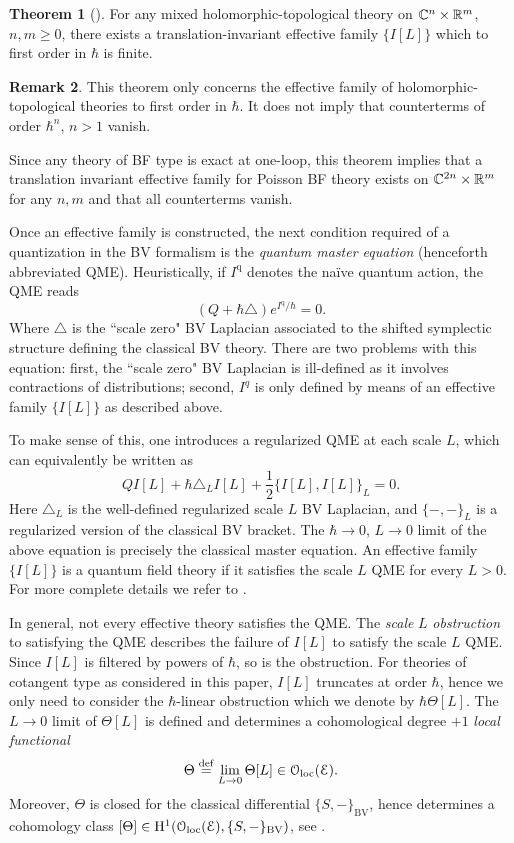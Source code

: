 \documentclass[11pt, oneside, reqno]{amsart}
\theoremstyle{definition} \newtheorem{definition}{Definition}[section]
\newtheorem{theorem}[definition]{Theorem}
\theoremstyle{definition}
\theoremstyle{remark}
\theoremstyle{definition} \newtheorem{remark}[definition]{Remark}
\theoremstyle{definition} \newtheorem{remarks}[definition]{Remarks}
\theoremstyle{definition} \newtheorem{question}[definition]{Question}
\theoremstyle{definition} \newtheorem*{note}{Note}
\theoremstyle{definition} \newtheorem{example}[definition]{Example}
\theoremstyle{definition} \newtheorem{examples}[definition]{Examples}
\def\oloc{\mathcal{O}_{\rm loc}}
\def\cE{\mathcal E}\def\cF{\mathcal F}\def\cG{\mathcal G}\def\cH{\mathcal H}
\newcommand{\mr}[1]{\mathrm{#1}}
\def\define{\overset{\rm def}{=}}
\begin{document}
\begin{theorem}[\cite{BWhol, GWcs, GWR}] \label{thm:oneloop}
For any mixed holomorphic-topological theory on $\mathbb C^n \times \mathbb R^m$, $n,m \geq 0$, there exists 
a translation-invariant effective family $\{I[L]\}$ which to first order in $\hbar$ is finite. 
\end{theorem}

\begin{remark}
This theorem only concerns the effective family of holomorphic-topological theories to first order in $\hbar$. 
It does not imply that counterterms of order $\hbar^n$, $n > 1$ vanish. 
\end{remark} 

Since any theory of BF type is exact at one-loop, this theorem implies that a translation invariant effective family for Poisson BF theory exists on $\mathbb C^{2n} \times \mathbb R^m$ for any $n,m$ and that all counterterms vanish.

Once an effective family is constructed, the next condition required of a quantization in the BV formalism is the {\em quantum master equation} (henceforth abbreviated QME). Heuristically, if $I^{\mr{q}}$ denotes the na\"ive quantum action, the QME reads
\[(Q + \hbar \triangle) e^{I^{\mr{q}}/\hbar} = 0.\]
Where $\triangle$ is the ``scale zero" BV Laplacian associated to the shifted symplectic structure defining the classical BV theory. 
There are two problems with this equation: first, the ``scale zero" BV Laplacian is ill-defined as it involves contractions of distributions; second, $I^q$ is only defined by means of an effective family $\{I[L]\}$ as described above. 

To make sense of this, one introduces a regularized QME at each scale $L$, which can equivalently be written as
\[
Q I[L] + \hbar \triangle_L I[L] + \frac{1}{2} \{I[L], I[L]\}_L = 0 .
\]
Here $\triangle_L$ is the well-defined regularized scale $L$ BV Laplacian, and $\{-,-\}_L$ is a regularized version of the classical BV bracket.
The $\hbar \to 0$, $L \to 0$ limit of the above equation is precisely the classical master equation. 
An effective family $\{I[L]\}$ is a quantum field theory if it satisfies the scale $L$ QME for every $L > 0$. 
For more complete details we refer to \cite[Chapter 8]{Book2}. 

In general, not every effective theory satisfies the QME. 
The {\em scale} $L$ {\em obstruction} to satisfying the QME describes the failure of $I[L]$ to satisfy the scale $L$ QME.
Since $I[L]$ is filtered by powers of $\hbar$, so is the obstruction.
For theories of cotangent type as considered in this paper, $I[L]$ truncates at order $\hbar$, hence we only need to consider the $\hbar$-linear obstruction which we denote by $\hbar \Theta[L]$. 
The $L \to 0$ limit of $\Theta[L]$ is defined and determines a cohomological degree $+1$ {\em local functional}
\[
\Theta \define \lim_{L \to 0} \Theta [L] \in \oloc(\cE) .
\]
Moreover, $\Theta$ is closed for the classical differential $\{S,-\}_{\mr{BV}}$, hence determines a cohomology class $[\Theta] \in \mr H^1(\oloc(\cE), \{S,-\}_{\mr{BV}})$, see \cite[\S 5.11]{CostelloBook}.
\end{document}
